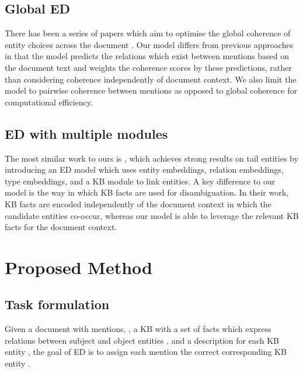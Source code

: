 \documentclass[11pt]{article}
\begin{document}
\subsection{Global ED}

There has been a series of papers which aim to optimise the global coherence of entity choices across the document \cite{hoffart-etal-2011-robust, cheng-roth-2013-relational, moro-etal-2014-entity, Pershina2015PersonalizedPR}. Our model differs from previous approaches in that the model predicts the relations which exist between mentions based on the document text and weights the coherence scores by these predictions, rather than considering coherence independently of document context. We also limit the model to pairwise coherence between mentions as opposed to global coherence for computational efficiency. 


\subsection{ED with multiple modules}
The most similar work to ours is \citet{bootleg}, which achieves strong results on tail entities by introducing an ED model which uses entity embeddings, relation embeddings, type embeddings, and a KB module to link entities. A key difference to our model is the way in which KB facts are used for disambiguation. In their work, KB facts are encoded independently of the document context in which the candidate entities co-occur, whereas our model is able to leverage the relevant KB facts for the document context.






\section{Proposed Method}
\subsection{Task formulation}
Given a document  with mentions, , a KB with a set of facts  which express relations  between subject  and object entities , and a description  for each KB entity , the goal of ED is to assign each mention  the correct corresponding KB entity .
\end{document}
